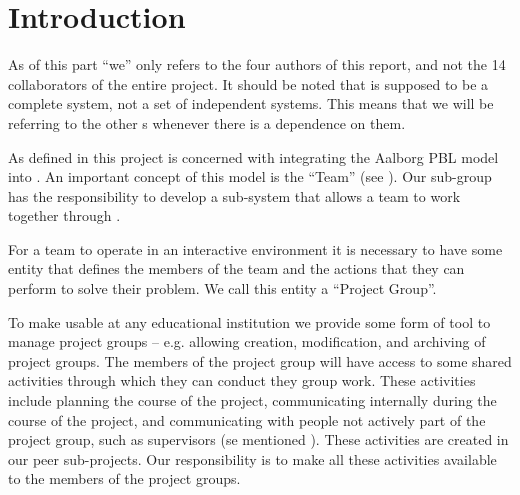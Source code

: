 \chapter{Introduction}
\label{chap:introProjectgroup}
As of this part ``we'' only refers to the four authors of this report, and not the 14 collaborators of the entire project.
It should be noted that \system{} is supposed to be a complete system, not a set of independent systems.
This means that we will be referring to the other \subsystem{}s whenever there is a dependence on them.



As defined in  this project is concerned with integrating the Aalborg PBL model into \moodle.
An important concept of this model is the ``Team'' (see ).
Our sub-group has the responsibility to develop a sub-system that allows a team to work together through \moodle.



For a team to operate in an interactive environment it is necessary to have some entity that defines the members of the team and the actions that they can perform to solve their problem.
We call this entity a ``Project Group''.



To make \system{} usable at any educational institution we provide some form of tool to manage project groups -- e.g. allowing  creation, modification, and archiving of project groups.
The members of the project group will have access to some shared activities through which they can conduct they group work.
These activities include planning the course of the project, communicating internally during the course of the project, and communicating with people not actively part of the project group, such as supervisors (se mentioned ).
These activities are created in our peer sub-projects.
Our responsibility is to make all these activities available to the members of the project groups.
